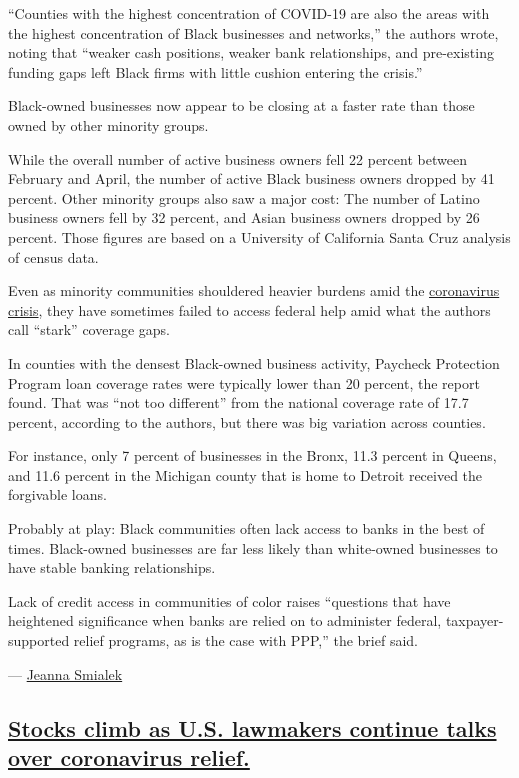 ``Counties with the highest concentration of COVID-19 are also the areas
with the highest concentration of Black businesses and networks,'' the
authors wrote, noting that ``weaker cash positions, weaker bank
relationships, and pre-existing funding gaps left Black firms with
little cushion entering the crisis.''

Black-owned businesses now appear to be closing at a faster rate than
those owned by other minority groups.

While the overall number of active business owners fell 22 percent
between February and April, the number of active Black business owners
dropped by 41 percent. Other minority groups also saw a major cost: The
number of Latino business owners fell by 32 percent, and Asian business
owners dropped by 26 percent. Those figures are based on a University of
California Santa Cruz analysis of census data.

Even as minority communities shouldered heavier burdens amid the
\href{https://www.nytimes3xbfgragh.onion/2020/04/07/us/coronavirus-race.html}{coronavirus
crisis}, they have sometimes failed to access federal help amid what the
authors call ``stark'' coverage gaps.

In counties with the densest Black-owned business activity, Paycheck
Protection Program loan coverage rates were typically lower than 20
percent, the report found. That was ``not too different'' from the
national coverage rate of 17.7 percent, according to the authors, but
there was big variation across counties.

For instance, only 7 percent of businesses in the Bronx, 11.3 percent in
Queens, and 11.6 percent in the Michigan county that is home to Detroit
received the forgivable loans.

Probably at play: Black communities often lack access to banks in the
best of times. Black-owned businesses are far less likely than
white-owned businesses to have stable banking relationships.

Lack of credit access in communities of color raises ``questions that
have heightened significance when banks are relied on to administer
federal, taxpayer-supported relief programs, as is the case with PPP,''
the brief said.

--- \href{https://www.nytimes3xbfgragh.onion/by/jeanna-smialek}{Jeanna
Smialek}

\hypertarget{stocks-climb-as-us-lawmakers-continue-talks-over-coronavirus-relief}{%
\subsection{\texorpdfstring{\protect\hyperlink{stocks-climb-as-us-lawmakers-continue-talks-over-coronavirus-relief}{Stocks
climb as U.S. lawmakers continue talks over coronavirus
relief.}}{Stocks climb as U.S. lawmakers continue talks over coronavirus relief.}}\label{stocks-climb-as-us-lawmakers-continue-talks-over-coronavirus-relief}}


